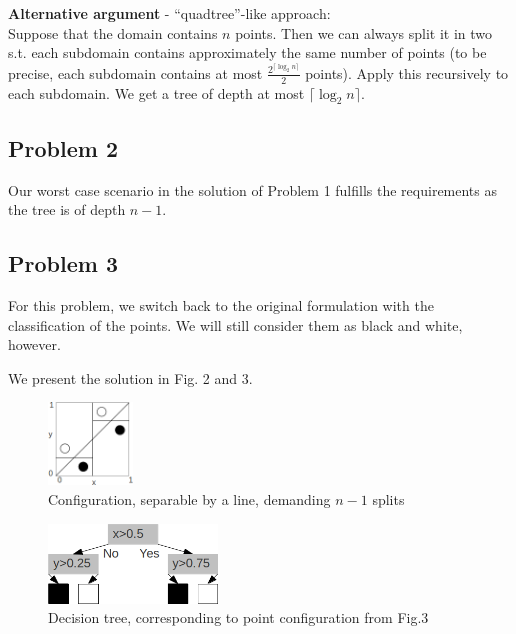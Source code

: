 \textbf{Alternative argument} - ``quadtree''-like approach:\\
Suppose that the domain contains $n$ points. Then we can always split it in two s.t. each subdomain contains approximately the same number of points (to be precise, each subdomain contains at most $\frac{2^{\lceil\log_2n\rceil}}{2}$ points). Apply this recursively to each subdomain. We get a tree of depth at most $\lceil\log_2n\rceil$.

\subsection*{Problem 2}
Our worst case scenario in the solution of Problem 1 fulfills the requirements as the tree is of depth $n-1$.

\newpage
\subsection*{Problem 3}
For this problem, we switch back to the original formulation with the classification of the points. We will still consider them as black and white, however.

We present the solution in Fig. 2 and 3.

\begin{figure}[!h]
  \begin{center}
    \includegraphics[width=0.2\textwidth]{plots/1_3.png}
    \caption{Configuration, separable by a line, demanding $n-1$ splits}
  \end{center}
\end{figure}

\begin{figure}[!h]
  \begin{center}
    \includegraphics[width=0.40\textwidth]{plots/1_3_2.png}
    \caption{Decision tree, corresponding to point configuration from Fig.3}
  \end{center}
\end{figure}
